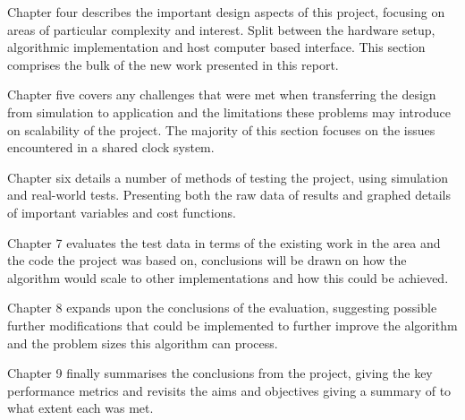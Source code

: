 Chapter four describes the important design aspects of this project, focusing on areas of particular complexity and interest. Split between the hardware setup, algorithmic implementation and host computer based interface. This section comprises the bulk of the new work presented in this report.

Chapter five covers any challenges that were met when transferring the design from simulation to application and the limitations these problems may introduce on scalability of the project. The majority of this section focuses on the issues encountered in a shared clock system.

Chapter six details a number of methods of testing the project, using simulation and real-world tests. Presenting both the raw data of results and graphed details of important variables and cost functions. 

Chapter 7 evaluates the test data in terms of the existing work in the area and the code the project was based on, conclusions will be drawn on how the algorithm would scale to other implementations and how this could be achieved. 

Chapter 8 expands upon the conclusions of the evaluation, suggesting possible further modifications that could be implemented to further improve the algorithm and the problem sizes this algorithm can process.

Chapter 9 finally summarises the conclusions from the project, giving the key performance metrics and revisits the aims and objectives giving a summary of to what extent each was met.